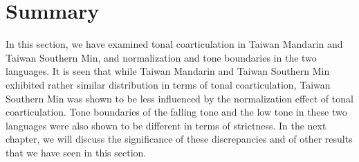 \section{Summary}
In this section, we have examined tonal coarticulation in Taiwan Mandarin and Taiwan Southern Min, and normalization and tone boundaries in the two languages. It is seen that while Taiwan Mandarin and Taiwan Southern Min exhibited rather similar distribution in terms of tonal coarticulation, Taiwan Southern Min was shown to be less influenced by the normalization effect of tonal coarticulation. Tone boundaries of the falling tone and the low tone in these two languages were also shown to be different in terms of strictness. In the next chapter, we will discuss the significance of these discrepancies and of other results that we have seen in this section.